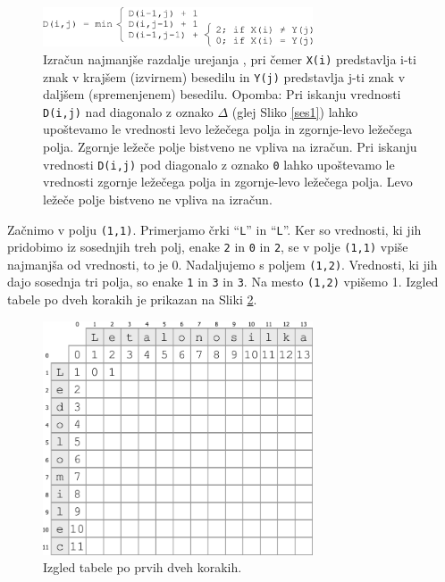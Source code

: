 \documentclass[a4paper, 12pt, twoside]{book}
\begin{document}
\begin{figure}[placement h]
\begin{center}
\includegraphics[width=8cm]{img/med2.pdf}
\end{center}
\caption{Izračun najmanjše razdalje urejanja \cite{med}, pri čemer {\tt X(i)} predstavlja i-ti znak v krajšem (izvirnem) besedilu in {\tt Y(j)} predstavlja j-ti znak v daljšem (spremenjenem) besedilu. Opomba: Pri iskanju vrednosti {\tt D(i,j)} nad diagonalo z oznako {\tt $\Delta$} (glej Sliko \ref{ses1}) lahko upoštevamo le vrednosti levo ležečega polja in zgornje-levo ležečega polja. Zgornje ležeče polje bistveno ne vpliva na izračun. Pri iskanju vrednosti {\tt D(i,j)} pod diagonalo z oznako {\tt 0} lahko upoštevamo le vrednosti zgornje ležečega polja in zgornje-levo ležečega polja. Levo ležeče polje bistveno ne vpliva na izračun.}
\label{med2}
\end{figure}

\pagebreak

Začnimo v polju {\tt (1,1)}. Primerjamo črki “{\tt L}” in “{\tt L}”. Ker so vrednosti, ki jih pridobimo iz sosednjih treh polj, enake {\tt 2} in {\tt 0} in {\tt 2}, se v polje {\tt (1,1)} vpiše najmanjša od vrednosti, to je 0. Nadaljujemo s poljem {\tt (1,2)}. Vrednosti, ki jih dajo sosednja tri polja, so enake {\tt 1} in {\tt 3} in {\tt 3}. Na mesto {\tt (1,2)} vpišemo 1. Izgled tabele po dveh korakih je prikazan na Sliki \ref{med3}.

\begin{figure}[placement h]
\begin{center}
\includegraphics[width=8cm]{img/med3.pdf}
\end{center}
\caption{Izgled tabele po prvih dveh korakih.}
\label{med3}
\end{figure}
\end{document}
